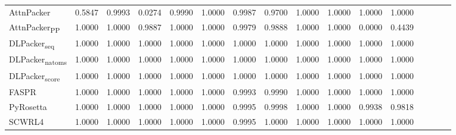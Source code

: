 \begin{table}
{\begin{tabular}{@{}lccccccccccccccc@{}}
                \textnormal{\hspace{0.5cm}AttnPacker} & 0.5847 & 0.9993 & 0.0274 & 0.9990 & 1.0000 & 0.9987 & 0.9700 & 1.0000 & 1.0000 & 1.0000 & 1.0000 \\
                \textnormal{\hspace{0.5cm}AttnPacker\textsubscript{PP}} & 1.0000 & 1.0000 & 0.9887 & 1.0000 & 1.0000 & 0.9979 & 0.9888 & 1.0000 & 1.0000 & 0.0000 & 0.4439 \\
                \textnormal{\hspace{0.5cm}DLPacker\textsubscript{seq}} & 1.0000 & 1.0000 & 1.0000 & 1.0000 & 1.0000 & 1.0000 & 1.0000 & 1.0000 & 1.0000 & 1.0000 & 1.0000 \\
                \textnormal{\hspace{0.5cm}DLPacker\textsubscript{natoms}} & 1.0000 & 1.0000 & 1.0000 & 1.0000 & 1.0000 & 1.0000 & 1.0000 & 1.0000 & 1.0000 & 1.0000 & 1.0000 \\
                \textnormal{\hspace{0.5cm}DLPacker\textsubscript{score}} & 1.0000 & 1.0000 & 1.0000 & 1.0000 & 1.0000 & 1.0000 & 1.0000 & 1.0000 & 1.0000 & 1.0000 & 1.0000 \\
                \textnormal{\hspace{0.5cm}FASPR} & 1.0000 & 1.0000 & 1.0000 & 1.0000 & 1.0000 & 0.9993 & 0.9990 & 1.0000 & 1.0000 & 1.0000 & 1.0000 \\
                \textnormal{\hspace{0.5cm}PyRosetta} & 1.0000 & 1.0000 & 1.0000 & 1.0000 & 1.0000 & 0.9995 & 0.9998 & 1.0000 & 1.0000 & 0.9938 & 0.9818 \\
                \textnormal{\hspace{0.5cm}SCWRL4} & 1.0000 & 1.0000 & 1.0000 & 1.0000 & 1.0000 & 0.9995 & 1.0000 & 1.0000 & 1.0000 & 1.0000 & 1.0000 \\
            \bottomrule
        \end{tabular}
    }
    \label{tab:casp14_p_values_table}
\end{table}